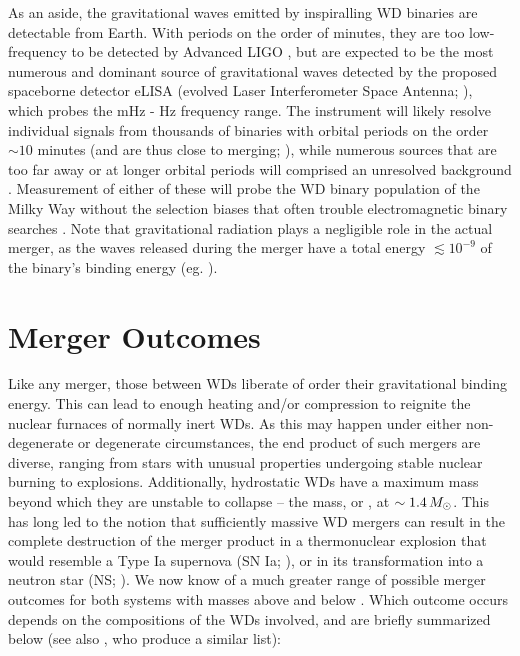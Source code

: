 As an aside, the gravitational waves emitted by inspiralling WD binaries are detectable from Earth.  With periods on the order of minutes, they are too low-frequency to be detected by Advanced LIGO \citep{ligo+15}, but are expected to be the most numerous and dominant source of gravitational waves \citep{mars11} detected by the proposed spaceborne detector eLISA (evolved Laser Interferometer Space Antenna; \citealt{amar+13}), which probes the mHz - Hz frequency range.  The instrument will likely resolve individual signals from thousands of binaries with orbital periods on the order $\sim10$ minutes (and are thus close to merging; \citealt{amar+13, mars11, dan+11}), while numerous sources that are too far away or at longer orbital periods will comprised an unresolved background \citep{neleyp01,amar+13}.  Measurement of either of these will probe the WD binary population of the Milky Way without the selection biases that often trouble electromagnetic binary searches \citep{mars11}.  Note that gravitational radiation plays a negligible role in the actual merger, as the waves released during the merger have a total energy $\lesssim10^{-9}$ of the binary's binding energy (eg. \citeal{loreig09}).


\section{Merger Outcomes}
\label{sec:c1_mergeroutcomes}

Like any merger, those between WDs liberate of order their gravitational binding energy.  This can lead to enough heating and/or compression to reignite the nuclear furnaces of normally inert WDs.  As this may happen under either non-degenerate or degenerate circumstances, the end product of such mergers are diverse, ranging from stars with unusual properties undergoing stable nuclear burning to explosions. Additionally, hydrostatic WDs have a maximum mass beyond which they are unstable to collapse -- the \cite{chan31} mass, or \Mch, at $\sim1.4\,\Msun$.  This has long led to the notion that sufficiently massive WD mergers can result in the complete destruction of the merger product in a thermonuclear explosion that would resemble a Type Ia supernova (SN Ia; \citealt{webb84}), or in its transformation into a neutron star (NS; \citealt{nomoi85, saion85}).  We now know of a much greater range of possible merger outcomes for both systems with masses above and below \Mch.  Which outcome occurs depends on the compositions of the WDs involved, and are briefly summarized below (see also \citealt{dan+14}, who produce a similar list):

